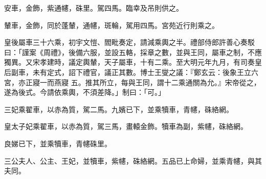 \begin{pinyinscope}
 安車，金飾，紫通幰，硃里。駕四馬。臨幸及吊則供之。



 輦車，金飾，同於蓬輦，通幰，斑輪，駕用四馬。宮苑近行則乘之。



 皇後屬車三十六乘，初宇文愷、閻毗奏定，請減乘輿之半。禮部侍郎許善心奏駁曰：「謹案《周禮》，後備六服，並設五輅，採章之數，並與王同，屬車之制，不應獨異。又宋孝建時，議定輿輦，天子屬車，十有二乘。至大明元年九月，有司奏皇后副車，未有定式，詔下禮官，議正其數。博士王燮之議：『鄭玄云：後象王立六宮，亦正寢一而燕寢
 五。推其所立，每與王同，謂十二乘通關為允。』宋帝從之，遂為後式。今請依乘輿，不須差降。」制曰：「可。」



 三妃乘翟車，以赤為質，駕二馬。九嬪已下，並乘犢車，青幰，硃絡網。



 皇太子妃乘翟車，以赤為質，駕三馬，畫轅金飾。犢車為副，紫幰，硃絡網。



 良娣已下，並乘犢車，青幰硃里。



 三公夫人、公主、王妃，並犢車，紫幰，硃絡網。五品已上命婦，並乘青幰，與其夫同。



\end{pinyinscope}